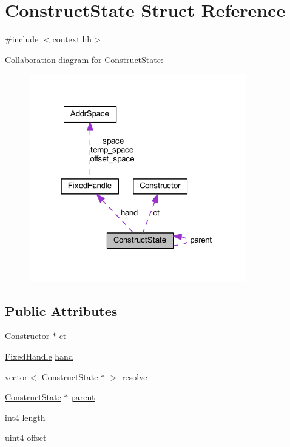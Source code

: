 \hypertarget{struct_construct_state}{}\section{Construct\+State Struct Reference}
\label{struct_construct_state}


{\ttfamily \#include $<$context.\+hh$>$}



Collaboration diagram for Construct\+State\+:
\nopagebreak
\begin{figure}[H]
\begin{center}
\leavevmode
\includegraphics[width=268pt]{struct_construct_state__coll__graph}
\end{center}
\end{figure}
\subsection*{Public Attributes}
\begin{DoxyCompactItemize}
\item 
\mbox{\hyperlink{class_constructor}{Constructor}} $\ast$ \mbox{\hyperlink{struct_construct_state_a37dd25a63821e118b18c951a5c0dd5fb}{ct}}
\item 
\mbox{\hyperlink{struct_fixed_handle}{Fixed\+Handle}} \mbox{\hyperlink{struct_construct_state_a5d6cd28d5b6016a31e09669b9c901143}{hand}}
\item 
vector$<$ \mbox{\hyperlink{struct_construct_state}{Construct\+State}} $\ast$ $>$ \mbox{\hyperlink{struct_construct_state_a9a471324ab2bef5b35a7f2f35d55bebc}{resolve}}
\item 
\mbox{\hyperlink{struct_construct_state}{Construct\+State}} $\ast$ \mbox{\hyperlink{struct_construct_state_a6b2acaed2be0ee237a8d31627ca9100e}{parent}}
\item 
int4 \mbox{\hyperlink{struct_construct_state_a2b3b540fde4116fd40c1270885234a16}{length}}
\item 
uint4 \mbox{\hyperlink{struct_construct_state_a2e811d9b2781e4ee403b471aa910046d}{offset}}
\end{DoxyCompactItemize}


